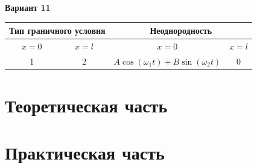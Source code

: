 \documentclass[a4paper,12pt,titlepage]{report}
\begin{document}
\singlespacing

\setcounter{page}{2}
\onehalfspacing\setlength{\parindent}{1.25cm}
\tableofcontents
\vspace{2em}
\begin{center}
\textbf{Вариант 11}\par\medskip
\begin{tabular}{|c|c|c|c|}
\hline
\multicolumn{2}{|c|}{Тип граничного условия} & \multicolumn{2}{c|}{Неоднородность}\\
\hline
$x=0$ & $x=l$ & $x=0$ & $x=l$\\
\hline
1 & 2 & $A\cos(\omega_1t)+B\sin(\omega_2t)$ & 0\\
\hline
\end{tabular}
\end{center}
\chapter{Теоретическая часть}



\chapter{Практическая часть}





\end{document}
